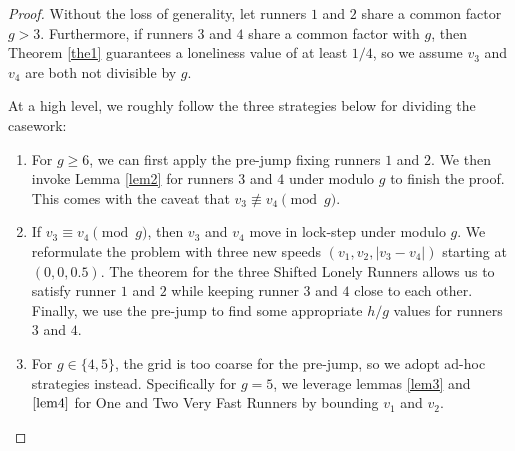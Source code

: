 \documentclass[11pt]{amsart}
\begin{document}
\begin{proof}
    Without the loss of generality, let runners $1$ and $2$ share a common factor $g > 3$. Furthermore, if runners $3$ and $4$ share a common factor with $g$, then Theorem \ref{the1} guarantees a loneliness value of at least $1/4$, so we assume $v_3$ and $v_4$ are both not divisible by $g$.
    
    At a high level, we roughly follow the three strategies below for dividing the casework:
    \begin{enumerate}[label=(\roman*)]
        \item For $g \geq 6$, we can first apply the pre-jump fixing runners $1$ and $2$. We then invoke Lemma \ref{lem2} for runners $3$ and $4$ under modulo $g$ to finish the proof. This comes with the caveat that $v_3 \not\equiv v_4 \pmod g$.
        \item If $v_3 \equiv v_4 \pmod g$, then $v_3$ and $v_4$ move in lock-step under modulo $g$. We reformulate the problem with three new speeds $(v_1, v_2, |v_3 - v_4|)$ starting at $(0,0,0.5)$. The theorem for the three Shifted Lonely Runners allows us to satisfy runner $1$ and $2$ while keeping runner $3$ and $4$ close to each other. Finally, we use the pre-jump to find some appropriate $h / g$ values for runners $3$ and $4$.
        \item For $g \in \{4, 5\}$, the grid is too coarse for the pre-jump, so we adopt ad-hoc strategies instead. Specifically for $g = 5$, we leverage lemmas \ref{lem3} and $\ref{lem4}$ for One and Two Very Fast Runners by bounding $v_1$ and $v_2$.
    \end{enumerate}
    

\end{proof}
\end{document}
